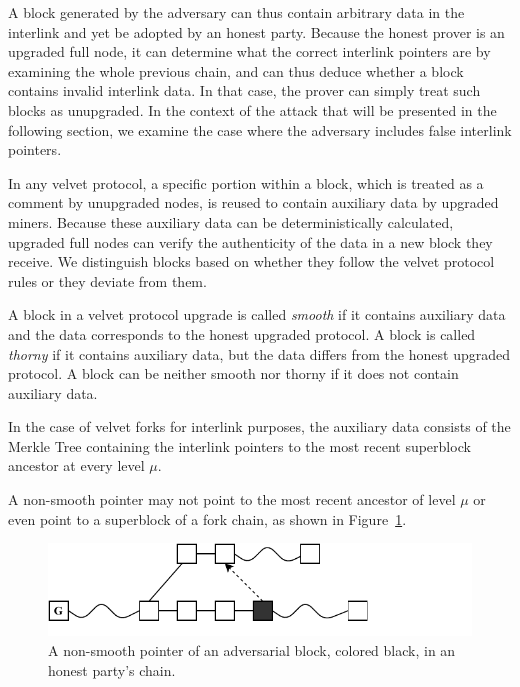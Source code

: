A block generated by the adversary can thus contain arbitrary data in the
interlink and yet be adopted by an honest party. Because the honest prover is an
upgraded full node, it can determine what the correct interlink pointers are by
examining the whole previous chain, and can thus deduce whether a block contains
invalid interlink data. In that case, the prover can simply treat such blocks as
unupgraded. In the context of the attack that will be presented in the following
section, we examine the case where the adversary includes false interlink
pointers.

In any velvet protocol, a specific portion within a block, which is treated as
a comment by unupgraded nodes, is reused to contain auxiliary data by upgraded
miners. Because these auxiliary data can be deterministically calculated,
upgraded full nodes can verify the authenticity of the data in a new block they
receive. We distinguish blocks based on whether they follow the velvet protocol
rules or they deviate from them.

\begin{definition}
A block in a velvet protocol upgrade is called \emph{smooth} if it contains
auxiliary data and the data corresponds to the honest upgraded protocol. A block
is called \emph{thorny} if it contains auxiliary data, but the data differs from
the honest upgraded protocol. A block can be neither smooth nor thorny if it
does not contain auxiliary data.
\end{definition}

In the case of velvet forks for interlink purposes, the auxiliary data consists
of the Merkle Tree containing the interlink pointers to the most recent
superblock ancestor at every level $\mu$.

A non-smooth pointer may not point to the most recent ancestor of level $\mu$ or even point to a superblock of a fork chain, as shown in Figure~\ref{fig:false_interlink}.

\begin{figure}[h]
	\begin{center}
		\includegraphics[width=0.9\columnwidth]{figures/false_interlink.pdf}
	\end{center}
    \caption{A non-smooth pointer of an adversarial block, colored black, in an honest party's chain.}
	\label{fig:false_interlink}
\end{figure}

